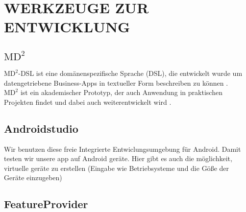 \section{\uppercase{Werkzeuge zur Entwicklung}}
	
	\subsection{$\text{MD}^2$}
	$\text{MD}^2$-DSL ist eine dom\"anenspezifische Sprache (DSL), die entwickelt wurde um datengetriebene Business-Apps in textueller Form beschreiben zu k\"onnen \cite{DSLMD2_2013}.\\
	$\text{MD}^2$ ist ein akademischer Prototyp, der auch Anwendung in praktischen Projekten findet und dabei auch weiterentwickelt wird \cite{MDCP2015}.
	
	\subsection{Androidstudio}
Wir benutzen diese freie Integrierte Entwiclungsumgebung für Android. Damit testen wir unsere app auf Android geräte. Hier gibt es auch die m\"oglichkeit, virtuelle ger\"ate zu erstellen (Eingabe wie Betriebsysteme und die G\"o{\ss}e der Ger\"ate einzugeben)

	\subsection{FeatureProvider}
	

